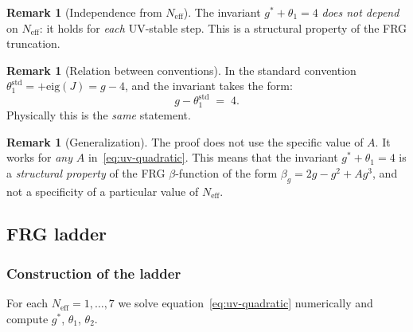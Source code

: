 \documentclass[11pt,a4paper]{article}
\theoremstyle{definition}
\newtheorem{remark}[theorem]{Remark}
\begin{document}
\begin{remark}[Independence from $N_{\text{eff}}$]
\label{rem:independence-neff}
The invariant $g^* + \theta_1 = 4$ \emph{does not depend} on $N_{\text{eff}}$:
it holds for \emph{each} UV-stable step. This is
a structural property of the FRG truncation.
\end{remark}

\begin{remark}[Relation between conventions]
\label{rem:conventions}
In the standard convention $\theta_1^{\text{std}} = +\mathrm{eig}(J) = g - 4$,
and the invariant takes the form:
\begin{equation}
    g - \theta_1^{\text{std}} \;=\; 4.
\end{equation}
Physically this is the \emph{same} statement.
\end{remark}

\begin{remark}[Generalization]
\label{rem:generalization}
The proof does not use the specific value of $A$. It
works for \emph{any} $A$ in~\eqref{eq:uv-quadratic}.
This means that the invariant $g^* + \theta_1 = 4$ is
a \emph{structural property} of the FRG $\beta$-function of the form
$\beta_g = 2g - g^2 + A g^3$, and not a specificity of a particular
value of $N_{\text{eff}}$.
\end{remark}

\subsection{FRG ladder}
\label{subsec:frg-ladder}

\subsubsection{Construction of the ladder}

For each $N_{\text{eff}} = 1, \ldots, 7$ we solve
equation~\eqref{eq:uv-quadratic} numerically and compute
$g^*$, $\theta_1$, $\theta_2$.
\end{document}
